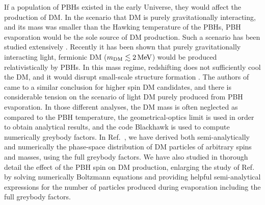 \documentclass[aps,prd,reprint,twocolumn,preprintnumbers,floatfix,nofootinbib]{revtex4-1}
\begin{document}
If a population of PBHs existed in the early Universe, they would affect the production of DM. In the scenario that DM is purely gravitationally interacting, and its mass was smaller than the Hawking temperature of the PBHs, PBH evaporation would be the sole source of DM production. Such a scenario has been studied extensively \cite{Matsas:1998zm,Bell:1998jk,Arbey:2021ysg,Khlopov:2004tn,Allahverdi:2017sks,Fujita:2014hha,Lennon:2017tqq,Morrison:2018xla,Masina:2020xhk,Hooper:2019gtx}. Recently it has been shown that purely gravitationally interacting light, fermionic DM ($m_{\rm DM}\lesssim 2\,\rm{MeV}$) would be produced relativistically by PBHs. In this mass regime, redshifting does not sufficiently cool the DM, and it would disrupt small-scale structure formation \cite{Baldes:2020nuv}. The authors of \cite{Auffinger:2020afu} came to a similar conclusion for higher spin DM candidates, and there is considerable tension on the scenario of light DM purely produced from PBH evaporation. In those different analyses, the DM mass is often neglected as compared to the PBH temperature, the geometrical-optics limit is used in order to obtain analytical results{, and the code \textsf{Blackhawk} is used to compute numerically greybody factors}. In Ref.~\cite{paper1}, we have derived both semi-analytically and numerically the phase-space distribution of DM particles of arbitrary spins and masses, using the full greybody factors. We have also studied in thorough detail the effect of the PBH spin on DM production{, enlarging the study of Ref.~\cite{Masina:2021zpu} by solving numerically Boltzmann equations and providing helpful semi-analytical expressions for the number of particles produced during evaporation including the full greybody factors}.
\end{document}
